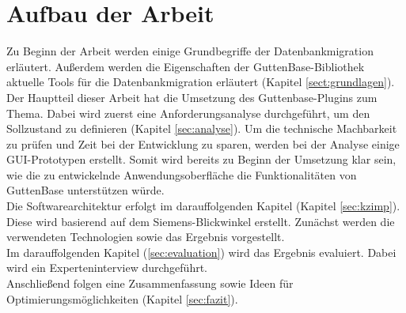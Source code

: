 \section{Aufbau der Arbeit}
Zu Beginn der Arbeit werden einige Grundbegriffe der Datenbankmigration erläutert. Außerdem werden die Eigenschaften der GuttenBase-Bibliothek aktuelle Tools für die Datenbankmigration erläutert (Kapitel \ref{sect:grundlagen}).\\
Der Hauptteil dieser Arbeit hat die Umsetzung des Guttenbase-Plugins zum Thema. Dabei wird zuerst eine Anforderungsanalyse durchgeführt, um den Sollzustand zu definieren (Kapitel \ref{sec:analyse}). Um die technische Machbarkeit zu prüfen und Zeit bei der Entwicklung zu sparen, werden bei der Analyse einige GUI-Prototypen erstellt. Somit wird bereits zu Beginn der Umsetzung klar sein, wie die zu entwickelnde Anwendungsoberfläche die Funktionalitäten von GuttenBase unterstützen würde. \\
Die Softwarearchitektur erfolgt im darauffolgenden Kapitel (Kapitel \ref{sec:kzimp}). Diese wird basierend auf dem Siemens-Blickwinkel erstellt. Zunächst werden die verwendeten Technologien sowie das Ergebnis vorgestellt.\\
Im darauffolgenden Kapitel (\ref{sec:evaluation}) wird das Ergebnis evaluiert. Dabei wird ein Experteninterview durchgeführt.\\
Anschließend folgen eine Zusammenfassung sowie Ideen für Optimierungsmöglichkeiten (Kapitel \ref{sec:fazit}).